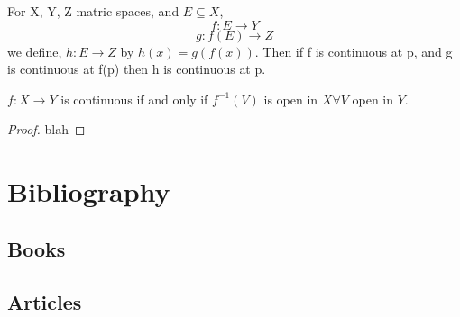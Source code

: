 \documentclass[11pt,fleqn]{book} %
\begin{document}
\begin{theorem}
	For X, Y, Z matric spaces, and $E \subseteq X$, 
	$$f: E \rightarrow Y$$
	$$g: f(E) \rightarrow Z$$
	we define, 
	$h: E \rightarrow Z$ by $h(x) = g(f(x))$.
	Then if f is continuous at p, and g is continuous at f(p) then h is continuous at p.
\end{theorem}

\begin{theorem}
	$f: X \rightarrow Y$ is continuous if and only if $f^{-1}(V)$ is open in $X \forall V$ open in $Y$.
\end{theorem}

\begin{proof}
	blah
\end{proof}

\chapter*{Bibliography}
\section*{Books}
\printbibliography[heading=bibempty,type=book]
\section*{Articles}
\printbibliography[heading=bibempty,type=article]


\cleardoublepage
{}
\setlength{\columnsep}{0.75cm}
\printindex

\end{document}
